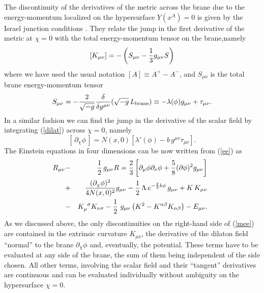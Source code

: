 \documentclass[prd,a4paper,twocolumn,superscriptaddress,nofootinbib,showpacs]{revtex4}
\def\half{{1\over 2}\,}
\begin{document}
The discontinuity of the derivatives of the metric across the brane due to the energy-momentum 
localized on the hypersurface $Y(x^{A})=0$ is given by the Israel junction conditions 
\cite{is,sms}. They relate the jump in the first derivative of the metric at $\chi=0$ with the 
total energy-momentum tensor on the brane,namely
\begin{equation}
\left[K_{\mu\nu}\right]=-\left(S_{\mu\nu}-{1 \over 3}g_{\mu\nu}S\right)
\label{sk}
\end{equation}
where we have used the usual notation $[A]\equiv A^{+}-A^{-}$, and
 $S_{\mu\nu}$ is the total brane energy-momentum tensor 
\begin{equation}
S_{\mu\nu}=-{2\over \sqrt{-g}}{\delta\over \delta g^{\mu\nu}}(\sqrt{-g}\,L_{\rm brane})
\equiv -\lambda(\phi)g_{\mu\nu}+\tau_{\mu\nu}.
\label{s}
\end{equation}
In a similar fashion we can find the jump in the derivative of the scalar field  
by integrating (\ref{dilat}) across $\chi=0$, namely
\begin{equation}
\left[\,\partial_{\chi}\phi\,\right]
= N(x,0)\left[\lambda'(\phi)-
b\,g^{\mu\nu}\tau_{\mu\nu}\right].
\label{matdil}
\end{equation}
The Einstein equations in four dimensions can be now written from
(\ref{ee}) as
\begin{eqnarray}
\hspace*{-0.2cm}
R_{\mu\nu}&-&\half g_{\mu\nu}R ={2\over 3}\left[\partial_{\mu}\phi\partial_{\nu}\phi+{5\over 8}
(\partial\phi)^2 g_{\mu\nu}\right] \nonumber \\
&+&{(\partial_{\chi}\phi)^2\over 4N(x,0)^2}g_{\mu\nu}-\half \Lambda\,
e^{-{2\over 3}k\phi}\,g_{\mu\nu} 
+ K\,K_{\mu\nu}\nonumber \\
&-&K_{\mu}^{\,\,\,\sigma}K_{\nu\sigma}
-\half\,g_{\mu\nu}\left(K^2-K^{\alpha\beta}
K_{\alpha\beta}\right)-E_{\mu\nu}.
\label{mee}
\end{eqnarray}
As we discussed above, the only discontinuities on the right-hand side of (\ref{mee}) are contained in
the extrinsic curvature $K_{\mu\nu}$, the derivative of the dilaton field ``normal'' to the brane
$\partial_{\chi}\phi$ and, eventually, the potential. These terms have to
be evaluated at any side of the
brane, the sum of them being independent of the side chosen. All other terms, involving the 
scalar field and their ``tangent'' derivatives are continuous and can be evaluated individually without 
ambiguity on the hypersurface $\chi=0$.
\end{document}
